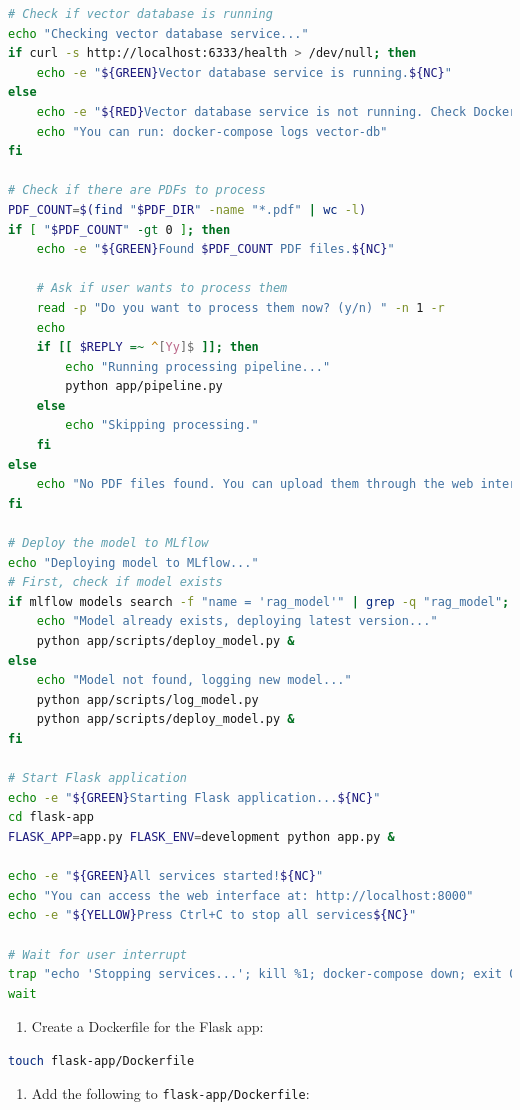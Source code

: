 \documentclass[
  screen,review,acmlarge]{acmart}
\newcommand{\passthrough}[1]{#1}
\providecommand{\tightlist}{%
  \setlength{\itemsep}{0pt}\setlength{\parskip}{0pt}}
\begin{document}
\begin{lstlisting}[language=bash]
# Check if vector database is running
echo "Checking vector database service..."
if curl -s http://localhost:6333/health > /dev/null; then
    echo -e "${GREEN}Vector database service is running.${NC}"
else
    echo -e "${RED}Vector database service is not running. Check Docker logs.${NC}"
    echo "You can run: docker-compose logs vector-db"
fi

# Check if there are PDFs to process
PDF_COUNT=$(find "$PDF_DIR" -name "*.pdf" | wc -l)
if [ "$PDF_COUNT" -gt 0 ]; then
    echo -e "${GREEN}Found $PDF_COUNT PDF files.${NC}"
    
    # Ask if user wants to process them
    read -p "Do you want to process them now? (y/n) " -n 1 -r
    echo
    if [[ $REPLY =~ ^[Yy]$ ]]; then
        echo "Running processing pipeline..."
        python app/pipeline.py
    else
        echo "Skipping processing."
    fi
else
    echo "No PDF files found. You can upload them through the web interface."
fi

# Deploy the model to MLflow
echo "Deploying model to MLflow..."
# First, check if model exists
if mlflow models search -f "name = 'rag_model'" | grep -q "rag_model"; then
    echo "Model already exists, deploying latest version..."
    python app/scripts/deploy_model.py &
else
    echo "Model not found, logging new model..."
    python app/scripts/log_model.py
    python app/scripts/deploy_model.py &
fi

# Start Flask application
echo -e "${GREEN}Starting Flask application...${NC}"
cd flask-app
FLASK_APP=app.py FLASK_ENV=development python app.py &

echo -e "${GREEN}All services started!${NC}"
echo "You can access the web interface at: http://localhost:8000"
echo -e "${YELLOW}Press Ctrl+C to stop all services${NC}"

# Wait for user interrupt
trap "echo 'Stopping services...'; kill %1; docker-compose down; exit 0" INT
wait
\end{lstlisting}

\begin{enumerate}
\def\labelenumi{\arabic{enumi}.}
\setcounter{enumi}{4}
\tightlist
\item
  Create a Dockerfile for the Flask app:
\end{enumerate}

\begin{lstlisting}[language=bash]
touch flask-app/Dockerfile
\end{lstlisting}

\begin{enumerate}
\def\labelenumi{\arabic{enumi}.}
\setcounter{enumi}{5}
\tightlist
\item
  Add the following to \passthrough{\lstinline!flask-app/Dockerfile!}:
\end{enumerate}
\end{document}
